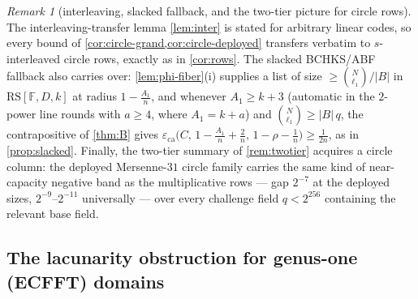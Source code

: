 \documentclass[11pt]{article}
\theoremstyle{definition}
\theoremstyle{remark}
\newtheorem{remark}[remark]{Remark}
\newcommand{\F}{\mathbb{F}}
\newcommand{\B}{B}
\newcommand{\RS}{\mathrm{RS}}
\newcommand{\eca}{\varepsilon_{\mathrm{ca}}}
\begin{document}
\begin{remark}[interleaving, slacked fallback, and the two-tier picture for circle rows]\label{rem:circle-transfer}
The interleaving-transfer lemma \cref{lem:inter} is stated for arbitrary linear codes, so every bound of \cref{cor:circle-grand,cor:circle-deployed} transfers verbatim to $s$-interleaved circle rows, exactly as in \cref{cor:rows}. The slacked BCHKS/ABF fallback also carries over: \cref{lem:phi-fiber}(i) supplies a list of size $\ge\binom N{\ell_1}/|\B|$ in $\RS[\F,D,k]$ at radius $1-\frac{A_1}n$, and whenever $A_1\ge k+3$ \textup(automatic in the $2$-power line rounds with $a\ge4$, where $A_1=k+a$\textup) and $\binom N{\ell_1}\ge|\B|\,q$, the contrapositive of \cref{thm:B} gives $\eca\bigl(C,\,1-\frac{A_1}n+\frac2n,\,1-\rho-\frac1n\bigr)\ge\frac1{2n}$, as in \cref{prop:slacked}. Finally, the two-tier summary of \cref{rem:twotier} acquires a circle column: the deployed Mersenne-$31$ circle family carries the same kind of near-capacity negative band as the multiplicative rows --- gap $2^{-7}$ at the deployed sizes, $2^{-9}$--$2^{-11}$ universally --- over every challenge field $q<2^{256}$ containing the relevant base field.
\end{remark}

\subsection{The lacunarity obstruction for genus-one (ECFFT) domains}
\label{sec:ecfft}
\end{document}
